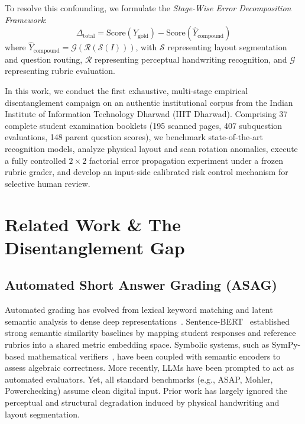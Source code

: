 \documentclass[journal]{IEEEtran}
\begin{document}
To resolve this confounding, we formulate the \textit{Stage-Wise Error Decomposition Framework}:
\begin{equation}
\label{eq:decomposition}
\Delta_{\text{total}} = \text{Score}(Y_{\text{gold}}) - \text{Score}(\hat{Y}_{\text{compound}})
\end{equation}
where $\hat{Y}_{\text{compound}} = \mathcal{G}(\mathcal{R}(\mathcal{S}(I)))$, with $\mathcal{S}$ representing layout segmentation and question routing, $\mathcal{R}$ representing perceptual handwriting recognition, and $\mathcal{G}$ representing rubric evaluation.

In this work, we conduct the first exhaustive, multi-stage empirical disentanglement campaign on an authentic institutional corpus from the Indian Institute of Information Technology Dharwad (IIIT Dharwad). Comprising 37 complete student examination booklets (195 scanned pages, 407 subquestion evaluations, 148 parent question scores), we benchmark state-of-the-art recognition models, analyze physical layout and scan rotation anomalies, execute a fully controlled $2 \times 2$ factorial error propagation experiment under a frozen rubric grader, and develop an input-side calibrated risk control mechanism for selective human review.

\section{Related Work \& The Disentanglement Gap}

\subsection{Automated Short Answer Grading (ASAG)}
Automated grading has evolved from lexical keyword matching and latent semantic analysis to dense deep representations~\cite{burrows2015erasag}. Sentence-BERT~\cite{reimers2019sentencebert} established strong semantic similarity baselines by mapping student responses and reference rubrics into a shared metric embedding space. Symbolic systems, such as SymPy-based mathematical verifiers~\cite{meurer2017sympy}, have been coupled with semantic encoders to assess algebraic correctness. More recently, LLMs have been prompted to act as automated evaluators. Yet, all standard benchmarks (e.g., ASAP, Mohler, Powerchecking) assume clean digital input. Prior work has largely ignored the perceptual and structural degradation induced by physical handwriting and layout segmentation.
\end{document}
